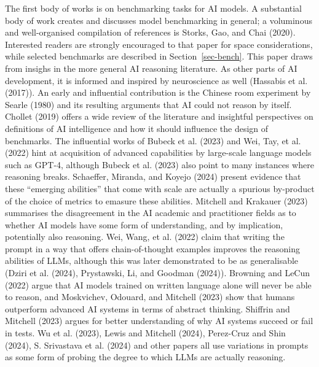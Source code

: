 \documentclass[
]{article}
\begin{document}
The first body of works is on benchmarking tasks for AI models. A
substantial body of work creates and discusses model benchmarking in
general; a voluminous and well-organised compilation of references is
Storks, Gao, and Chai (2020). Interested readers are strongly encouraged
to that paper for space considerations, while selected benchmarks are
described in Section~\ref{sec-bench}. This paper draws from insighs in
the more general AI reasoning literature. As other parts of AI
development, it is informed and inspired by neuroscience as well
(Hassabis et al. (2017)). An early and influential contribution is the
Chinese room experiment by Searle (1980) and its resulting arguments
that AI could not reason by itself. Chollet (2019) offers a wide review
of the literature and insightful perspectives on definitions of AI
intelligence and how it should influence the design of benchmarks. The
influential works of Bubeck et al. (2023) and Wei, Tay, et al. (2022)
hint at acquisition of advanced capabilities by large-scale language
models such as GPT-4, although Bubeck et al. (2023) also point to many
instances where reasoning breaks. Schaeffer, Miranda, and Koyejo (2024)
present evidence that these ``emerging abilities'' that come with scale
are actually a spurious by-product of the choice of metrics to emasure
these abilities. Mitchell and Krakauer (2023) summarises the
disagreement in the AI academic and practitioner fields as to whether AI
models have some form of understanding, and by implication, potentially
also reasoning. Wei, Wang, et al. (2022) claim that writing the prompt
in a way that offers chain-of-thought examples improves the reasoning
abilities of LLMs, although this was later demonstrated to be as
generalisable (Dziri et al. (2024), Prystawski, Li, and Goodman (2024)).
Browning and LeCun (2022) argue that AI models trained on written
language alone will never be able to reason, and Moskvichev, Odouard,
and Mitchell (2023) show that humans outperform advanced AI systems in
terms of abstract thinking. Shiffrin and Mitchell (2023) argues for
better understanding of why AI systems succeed or fail in tests. Wu et
al. (2023), Lewis and Mitchell (2024), Perez-Cruz and Shin (2024), S.
Srivastava et al. (2024) and other papers all use variations in prompts
as some form of probing the degree to which LLMs are actually reasoning.
\end{document}
